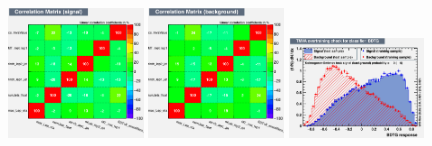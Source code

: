 \begin{figure}[htb]
 \includegraphics[width=0.32\textwidth]{plots_extraction/training/train_2lss_ttbar_bdtv8_value/CorrelationMatrixS}
 \includegraphics[width=0.32\textwidth]{plots_extraction/training/train_2lss_ttbar_bdtv8_value/CorrelationMatrixB}
 \includegraphics[width=0.32\textwidth]{plots_extraction/training/train_2lss_ttbar_bdtv8_value/overtrain_BDTG.png}
\end{figure}

\clearpage

